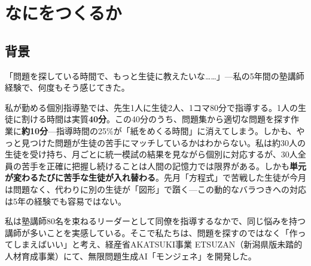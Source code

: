 \documentclass[paper=a4,fontsize=10.5bp,jafontsize=10.5bp,twocolumn]{jlreq}
\begin{document}


\section{なにをつくるか}

\subsection{背景}

「問題を探している時間で、もっと生徒に教えたいな……」---私の5年間の塾講師経験で、何度もそう感じてきた。

私が勤める個別指導塾では、先生1人に生徒2人、1コマ80分で指導する。1人の生徒に割ける時間は実質\textbf{40分}。この40分のうち、問題集から適切な問題を探す作業に\textbf{約10分}---指導時間の25\%が「紙をめくる時間」に消えてしまう。しかも、やっと見つけた問題が生徒の苦手にマッチしているかはわからない。私は約30人の生徒を受け持ち、月ごとに統一模試の結果を見ながら個別に対応するが、30人全員の苦手を正確に把握し続けることは人間の記憶力では限界がある。しかも\textbf{単元が変わるたびに苦手な生徒が入れ替わる}。先月「方程式」で苦戦した生徒が今月は問題なく、代わりに別の生徒が「図形」で躓く---この動的なバラつきへの対応は5年の経験でも容易ではない。

私は塾講師80名を束ねるリーダーとして同僚を指導するなかで、同じ悩みを持つ講師が多いことを実感している。そこで私たちは、問題を探すのではなく「作ってしまえばいい」と考え、経産省AKATSUKI事業 ETSUZAN（新潟県版未踏的人材育成事業）にて、無限問題生成AI「モンジェネ」を開発した。
\end{document}
